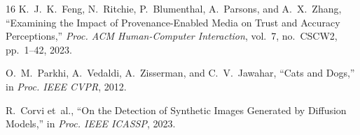 \documentclass[conference]{IEEEtran}
\begin{document}
\begin{thebibliography}{16}
  K.~J.~K.~Feng, N.~Ritchie, P.~Blumenthal, A.~Parsons,
  and A.~X.~Zhang,
  ``Examining the Impact of Provenance-Enabled Media on Trust and
  Accuracy Perceptions,''
  \emph{Proc. ACM Human-Computer Interaction},
  vol.~7, no.~CSCW2, pp.~1--42, 2023.

  O.~M.~Parkhi, A.~Vedaldi, A.~Zisserman, and C.~V.~Jawahar,
  ``Cats and Dogs,''
  in \emph{Proc. IEEE CVPR}, 2012.

  R.~Corvi et~al.,
  ``On the Detection of Synthetic Images Generated by Diffusion
  Models,''
  in \emph{Proc. IEEE ICASSP}, 2023.


\end{thebibliography}
\end{document}
